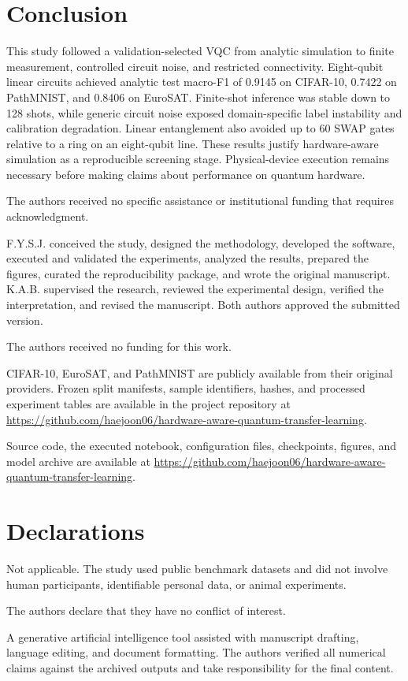 \documentclass[pdflatex,sn-mathphys-num]{sn-jnl}
\begin{document}
\section{Conclusion}

This study followed a validation-selected VQC from analytic simulation to finite measurement, controlled circuit noise, and restricted connectivity. Eight-qubit linear circuits achieved analytic test macro-F1 of 0.9145 on CIFAR-10, 0.7422 on PathMNIST, and 0.8406 on EuroSAT. Finite-shot inference was stable down to 128 shots, while generic circuit noise exposed domain-specific label instability and calibration degradation. Linear entanglement also avoided up to 60 SWAP gates relative to a ring on an eight-qubit line. These results justify hardware-aware simulation as a reproducible screening stage. Physical-device execution remains necessary before making claims about performance on quantum hardware.

\backmatter

The authors received no specific assistance or institutional funding that requires acknowledgment.

F.Y.S.J. conceived the study, designed the methodology, developed the software, executed and validated the experiments, analyzed the results, prepared the figures, curated the reproducibility package, and wrote the original manuscript. K.A.B. supervised the research, reviewed the experimental design, verified the interpretation, and revised the manuscript. Both authors approved the submitted version.

The authors received no funding for this work.

CIFAR-10, EuroSAT, and PathMNIST are publicly available from their original providers. Frozen split manifests, sample identifiers, hashes, and processed experiment tables are available in the project repository at \url{https://github.com/haejoon06/hardware-aware-quantum-transfer-learning}.

Source code, the executed notebook, configuration files, checkpoints, figures, and model archive are available at \url{https://github.com/haejoon06/hardware-aware-quantum-transfer-learning}.

\section*{Declarations}

Not applicable. The study used public benchmark datasets and did not involve human participants, identifiable personal data, or animal experiments.

The authors declare that they have no conflict of interest.

A generative artificial intelligence tool assisted with manuscript drafting, language editing, and document formatting. The authors verified all numerical claims against the archived outputs and take responsibility for the final content.


\end{document}
